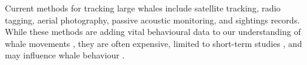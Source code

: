 \documentclass[a4paper,12pt]{article}
\begin{document}
Current methods for tracking large whales include satellite tracking, radio tagging, aerial photography, passive acoustic monitoring, and sightings records. 
While these methods are adding vital behavioural data to our understanding of whale movements \cite{bailey2009behavioural,mate2007evolution,silva2013north}, they are often expensive, limited to short-term studies \cite{bailey2009behavioural,mate2007evolution}, and may influence whale behaviour \cite{walker2012review}.

\end{document}

